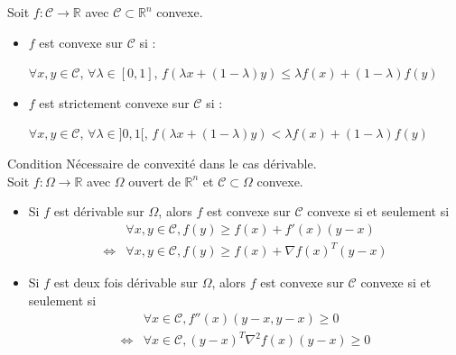 \documentclass[12pt,a4paper]{article}
\newcommand{\propriete}[2]{%
    \begin{tcolorbox}[colback=white,colframe=green!25!white,title=\textbf{Propriété #1}, coltitle=black]
        #2
    \end{tcolorbox}
}
\newcommand{\definition}[2]{%
    \begin{tcolorbox}[colback=white,colframe=blue!25!white,title=\textbf{Définition #1}, coltitle=black]
        #2
    \end{tcolorbox}
}
\begin{document}
\definition{- Fonctions convexes}{
    Soit $f : \mathcal{C} \rightarrow \mathbb{R}$ avec $\mathcal{C} \subset \mathbb{R}^n$ convexe.
    \begin{itemize}
        \item $f$ est convexe sur $\mathcal{C}$ si : 
        \begin{center}
            $\forall x, y \in \mathcal{C}$, $\forall \lambda \in [0, 1]$, $f(\lambda x + (1 - \lambda) y) \leq \lambda f(x) + (1 - \lambda) f(y)$
        \end{center}
        \item $f$ est strictement convexe sur $\mathcal{C}$ si :
        \begin{center}
            $\forall x, y \in \mathcal{C}$, $\forall \lambda \in ]0, 1[$, $f(\lambda x + (1 - \lambda) y) < \lambda f(x) + (1 - \lambda) f(y)$
        \end{center}
    \end{itemize}
}


\propriete{- CNS}{Condition Nécessaire de convexité dans le cas dérivable.\\
Soit $f : \Omega \rightarrow \mathbb{R}$ avec $\Omega$ ouvert de $\mathbb{R}^n$ et $\mathcal{C} \subset \Omega$ convexe.
\begin{itemize}
    \item Si $f$ est dérivable sur $\Omega$, alors $f$ est convexe sur $\mathcal{C}$ convexe si et seulement si
    \begin{align*}
        &\forall x, y \in \mathcal{C}, f(y) \geq f(x) + f'(x)(y - x)\\
        \Leftrightarrow &\forall x, y \in \mathcal{C}, f(y) \geq f(x) + \nabla f(x)^T(y - x)
    \end{align*}
    \item Si $f$ est deux fois dérivable sur $\Omega$, alors $f$ est convexe sur $\mathcal{C}$ convexe si et seulement si
    \begin{align*}
        &\forall x \in \mathcal{C}, f''(x)(y - x, y - x) \geq 0\\
        \Leftrightarrow &\forall x \in \mathcal{C}, (y - x)^T \nabla^2 f(x) (y - x) \geq 0
    \end{align*}
\end{itemize}
}
\end{document}
